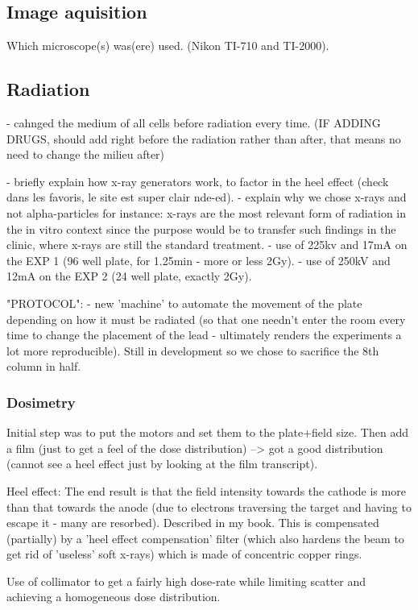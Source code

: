 \documentclass[onecolumn,10pt]{asme2ej}
\begin{document}
\subsection{Image aquisition}
Which microscope(s) was(ere) used.
 (Nikon TI-710 and TI-2000).


\subsection{Radiation}
- cahnged the medium of all cells before radiation every time. (IF ADDING DRUGS, should add right before the radiation rather than after, that means no need to change the milieu after)

- briefly explain how x-ray generators work, to factor in the heel effect (check dans les favoris, le site est super clair nde-ed). 
- explain why we chose x-rays and not alpha-particles for instance: x-rays are the most relevant form of radiation in the in vitro context since the purpose would be to transfer such findings in the clinic, where x-rays are still the standard treatment.
- use of 225kv and 17mA on the EXP 1 (96 well plate, for 1.25min - more or less 2Gy).
- use of 250kV and 12mA on the EXP 2 (24 well plate, exactly 2Gy).

"PROTOCOL":
- new 'machine' to automate the movement of the plate depending on how it must be radiated (so that one needn't enter the room every time to change the placement of the lead - ultimately renders the experiments a lot more reproducible). Still in development so we chose to sacrifice the 8th column in half. 


\subsubsection{Dosimetry}
Initial step was to put the motors and set them to the plate+field size. Then add a film (just to get a feel of the dose distribution) --> got a good distribution (cannot see a heel effect just by looking at the film transcript).

Heel effect: The end result is that the field intensity towards the cathode is more than that towards the anode (due to electrons traversing the target and having to escape it - many are resorbed). Described in my book. 
This is compensated (partially) by a 'heel effect compensation' filter (which also hardens the beam to get rid of 'useless' soft x-rays) which is made of concentric copper rings. 
 

Use of collimator to get a fairly high dose-rate while limiting scatter and achieving a homogeneous dose distribution.
\end{document}
